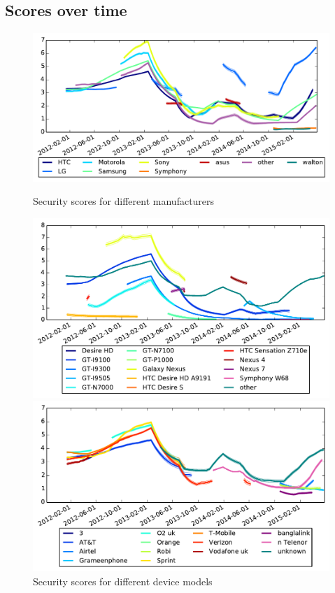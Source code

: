 \subsection{Scores over time}
\begin{figure}
\centering
\includegraphics[width=\columnwidth]{figures/security_score_manufacturer}
\caption{Security scores for different manufacturers}
\label{fig:security_score_manufacturer}
\includegraphics[width=\columnwidth]{figures/security_score_model}
\caption{Security scores for different device models}
\label{fig:security_score_model}
\includegraphics[width=\columnwidth]{figures/security_score_operator}

\end{figure}
